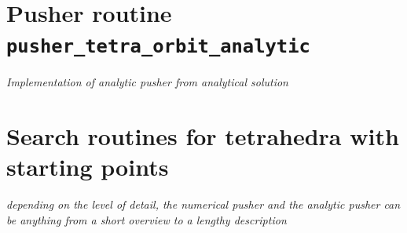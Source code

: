 \documentclass[./main.tex]{subfiles}
\begin{document}
\newpage
\section{Pusher routine \texttt{pusher\_tetra\_orbit\_analytic}}
\label{sec:AnalyticPusher}
\emph{Implementation of analytic pusher from analytical solution}
\newpage
\section{Search routines for tetrahedra with starting points}

\emph{depending on the level of detail, the numerical pusher and the analytic pusher can be anything from a short overview to a lengthy description}
\end{document}
